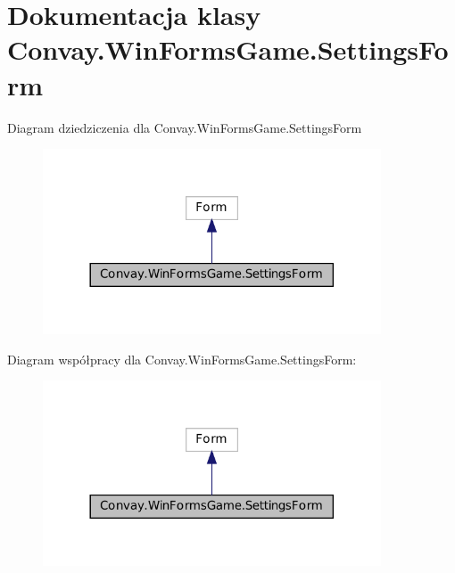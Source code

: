 \hypertarget{class_convay_1_1_win_forms_game_1_1_settings_form}{}\section{Dokumentacja klasy Convay.\+Win\+Forms\+Game.\+Settings\+Form}
\label{class_convay_1_1_win_forms_game_1_1_settings_form}


Diagram dziedziczenia dla Convay.\+Win\+Forms\+Game.\+Settings\+Form
\nopagebreak
\begin{figure}[H]
\begin{center}
\leavevmode
\includegraphics[width=284pt]{class_convay_1_1_win_forms_game_1_1_settings_form__inherit__graph}
\end{center}
\end{figure}


Diagram współpracy dla Convay.\+Win\+Forms\+Game.\+Settings\+Form\+:
\nopagebreak
\begin{figure}[H]
\begin{center}
\leavevmode
\includegraphics[width=284pt]{class_convay_1_1_win_forms_game_1_1_settings_form__coll__graph}
\end{center}
\end{figure}
